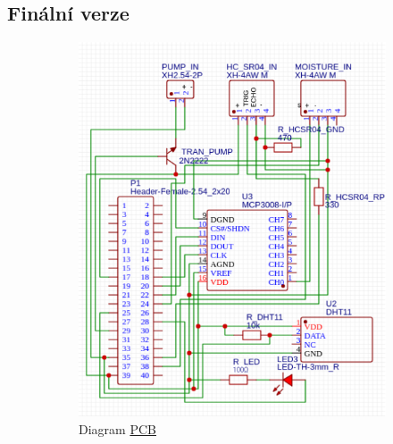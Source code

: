 \documentclass[12pt,a4paper]{article}
\begin{document}
\subsection{Finální verze}

\begin{figure}[h]
	\centering
	\begin{subfigure}[b]{0.4\linewidth}
		\includegraphics[width=\linewidth]{pcb.png}
		\caption{Diagram \underline{\ac{PCB}}}
	\end{subfigure}
	\begin{subfigure}[b]{0.4\linewidth}

\end{subfigure}
\end{figure}
\end{document}
